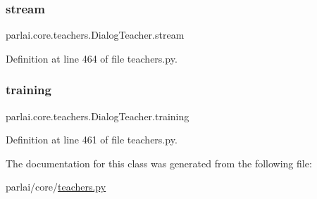 \subsubsection{\texorpdfstring{stream}{stream}}
{\footnotesize\ttfamily parlai.\+core.\+teachers.\+Dialog\+Teacher.\+stream}



Definition at line 464 of file teachers.\+py.

\mbox{\label{classparlai_1_1core_1_1teachers_1_1DialogTeacher_aaca26d863c30e54b4612539843f20b49}} 
\subsubsection{\texorpdfstring{training}{training}}
{\footnotesize\ttfamily parlai.\+core.\+teachers.\+Dialog\+Teacher.\+training}



Definition at line 461 of file teachers.\+py.



The documentation for this class was generated from the following file\+:\begin{DoxyCompactItemize}
\item 
parlai/core/\hyperlink{teachers_8py}{teachers.\+py}\end{DoxyCompactItemize}
